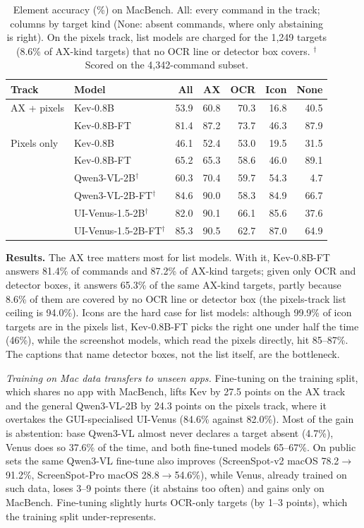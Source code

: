 \documentclass[a4paper,twoside]{article}
\newcommand{\bench}{MacBench}
\begin{document}
\begin{table}[t]
\centering
\caption{Element accuracy (\%) on \bench{}. All: every command in the track; columns by target kind (None: absent commands, where only abstaining is right). On the pixels track, list models are charged for the 1,249 targets (8.6\% of AX-kind targets) that no OCR line or detector box covers. $^\dagger$Scored on the 4,342-command subset.}
\label{tab:results}
\small
\setlength{\tabcolsep}{4pt}
\begin{tabular}{@{}llrrrrr@{}}
\toprule
Track & Model & All & AX & OCR & Icon & None \\
\midrule
AX + pixels & Kev-0.8B & 53.9 & 60.8 & 70.3 & 16.8 & 40.5 \\
            & Kev-0.8B-FT & 81.4 & 87.2 & 73.7 & 46.3 & 87.9 \\
\midrule
Pixels only & Kev-0.8B & 46.1 & 52.4 & 53.0 & 19.5 & 31.5 \\
            & Kev-0.8B-FT & 65.2 & 65.3 & 58.6 & 46.0 & 89.1 \\
            & Qwen3-VL-2B$^\dagger$ & 60.3 & 70.4 & 59.7 & 54.3 & 4.7 \\
            & Qwen3-VL-2B-FT$^\dagger$ & 84.6 & 90.0 & 58.3 & 84.9 & 66.7 \\
            & UI-Venus-1.5-2B$^\dagger$ & 82.0 & 90.1 & 66.1 & 85.6 & 37.6 \\
            & UI-Venus-1.5-2B-FT$^\dagger$ & 85.3 & 90.5 & 62.7 & 87.0 & 64.9 \\
\bottomrule
\end{tabular}
\end{table}

\textbf{Results.} The AX tree matters most for list models. With it, Kev-0.8B-FT answers 81.4\% of commands and 87.2\% of AX-kind targets; given only OCR and detector boxes, it answers 65.3\% of the same AX-kind targets, partly because 8.6\% of them are covered by no OCR line or detector box (the pixels-track list ceiling is 94.0\%). Icons are the hard case for list models: although 99.9\% of icon targets are in the pixels list, Kev-0.8B-FT picks the right one under half the time (46\%), while the screenshot models, which read the pixels directly, hit 85--87\%. The captions that name detector boxes, not the list itself, are the bottleneck.

\emph{Training on Mac data transfers to unseen apps.} Fine-tuning on the training split, which shares no app with \bench{}, lifts Kev by 27.5 points on the AX track and the general Qwen3-VL-2B by 24.3 points on the pixels track, where it overtakes the GUI-specialised UI-Venus (84.6\% against 82.0\%). Most of the gain is abstention: base Qwen3-VL almost never declares a target absent (4.7\%), Venus does so 37.6\% of the time, and both fine-tuned models 65--67\%. On public sets the same Qwen3-VL fine-tune also improves (ScreenSpot-v2 macOS 78.2$\to$91.2\%, ScreenSpot-Pro macOS 28.8$\to$54.6\%), while Venus, already trained on such data, loses 3--9 points there (it abstains too often) and gains only on \bench{}. Fine-tuning slightly hurts OCR-only targets (by 1--3 points), which the training split under-represents.
\end{document}
